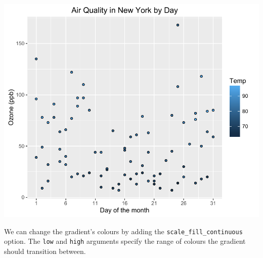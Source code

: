 \begin{Shaded}
\begin{Highlighting}[]
\StringTok{ }\NormalTok{(}   \StringTok{ }
\StringTok{  }\NormalTok{(} \NormalTok{) +}
\StringTok{  }\NormalTok{(}\NormalTok{) +}\StringTok{ }
\StringTok{  }\NormalTok{(} \NormalTok{, } \NormalTok{) +}
\StringTok{  }\NormalTok{(} \NormalTok{(}\NormalTok{, }\NormalTok{, }\NormalTok{))}
\end{Highlighting}
\end{Shaded}

\begin{center}\includegraphics[width=0.6\linewidth]{5_Scatter_Plots_pdf/scatter_7-1} \end{center}

We can change the gradient's colours by adding the
\texttt{scale\_fill\_continuous} option. The \texttt{low} and
\texttt{high} arguments specify the range of colours the gradient should
transition between.

\begin{Shaded}
\begin{Highlighting}[]
\StringTok{  }\StringTok{ }\NormalTok{(} \NormalTok{, } \NormalTok{)}
\end{Highlighting}
\end{Shaded}

